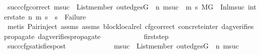 \begin{isabellebody}
\ succ{\isacharunderscore}{\kern0pt}cfg{\isacharunderscore}{\kern0pt}correct{\isacharcolon}{\kern0pt}\ {\isachardoublequoteopen}{\isacharparenleft}{\kern0pt}{\isasymforall}msuc{}{\isachardot}{\kern0pt}\ \ List{\isachardot}{\kern0pt}member\ {\isacharparenleft}{\kern0pt}out{\isacharunderscore}{\kern0pt}edges{\isacharparenleft}{\kern0pt}G{\isacharparenright}{\kern0pt}\ {\isacharbang}{\kern0pt}\ n{\isacharparenright}{\kern0pt}\ msuc{}\ {\isasymlongrightarrow}\ {\isacharparenleft}{\kern0pt}{\isasymforall}m{}\ s{}{\isachardot}{\kern0pt}\ {\isacharparenleft}{\kern0pt}{\isacharparenleft}{\kern0pt}M{\isacharcomma}{\kern0pt}{\isasymLambda}{\isacharcomma}{\kern0pt}{\isasymGamma}{\isacharcomma}{\kern0pt}{\isasymOmega}{\isacharcomma}{\kern0pt}G\ {\isasymturnstile}\ {\isacharparenleft}{\kern0pt}Inl{\isacharparenleft}{\kern0pt}msuc{}{\isacharparenright}{\kern0pt}{\isacharcomma}{\kern0pt}\ inter{\isacharunderscore}{\kern0pt}state{\isacharparenright}{\kern0pt}\ {\isacharminus}{\kern0pt}n{\isasymrightarrow}{\isacharasterisk}{\kern0pt}\ {\isacharparenleft}{\kern0pt}m{}{\isacharcomma}{\kern0pt}\ s{}{\isacharparenright}{\kern0pt}{\isacharparenright}{\kern0pt}\ {\isasymlongrightarrow}\ s{}\ {\isasymnoteq}\ Failure{\isacharparenright}{\kern0pt}{\isacharparenright}{\kern0pt}{\isacharparenright}{\kern0pt}{\isachardoublequoteclose}\isanewline
\ \ \ \ \ \ \ \ \ \ \ \ \isamarkupfalse%
\ {\isacharparenleft}{\kern0pt}metis\ Pair{\isacharunderscore}{\kern0pt}inject\ assms{\isacharparenleft}{\kern0pt}{}{\isacharparenright}{\kern0pt}\ assms{\isacharparenleft}{\kern0pt}{}{\isacharparenright}{\kern0pt}\ block{\isacharunderscore}{\kern0pt}local{\isacharunderscore}{\kern0pt}rel\ cfg{\isacharunderscore}{\kern0pt}correct\ concrete{\isacharunderscore}{\kern0pt}inter{}\ dag{\isacharunderscore}{\kern0pt}verifies{\isacharunderscore}{\kern0pt}propagate\ dag{\isacharunderscore}{\kern0pt}verifies{\isacharunderscore}{\kern0pt}propagate{\isacharunderscore}{\kern0pt}{}{\isacharparenright}{\kern0pt}\isanewline
\isanewline
\ \ \ \ \ \ \ \ \ \ \isamarkupfalse%
\ first{\isacharunderscore}{\kern0pt}step\isanewline
\ \ \ \ \ \ \ \ \ \ \isamarkupfalse%
\ succ{\isacharunderscore}{\kern0pt}cfg{\isacharunderscore}{\kern0pt}satisfies{\isacharunderscore}{\kern0pt}post{\isacharcolon}{\kern0pt}\ \isanewline
\ \ \ \ \ \ \ \ \ \ \ \ {\isachardoublequoteopen}{\isacharparenleft}{\kern0pt}{\isasymforall}msuc{}{\isachardot}{\kern0pt}\ \ List{\isachardot}{\kern0pt}member\ {\isacharparenleft}{\kern0pt}out{\isacharunderscore}{\kern0pt}edges{\isacharparenleft}{\kern0pt}G{\isacharparenright}{\kern0pt}\ {\isacharbang}{\kern0pt}\ n{\isacharparenright}{\kern0pt}\ msuc{}\ {\isasymlongrightarrow}\ \isanewline

\end{isabellebody}
